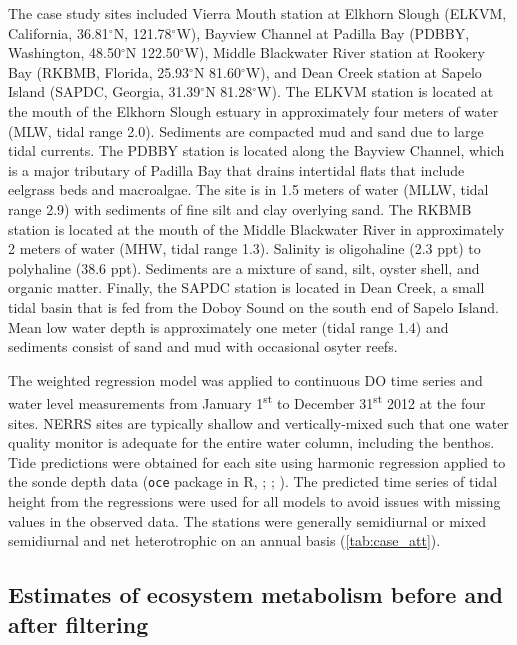 \documentclass[letterpaper,12pt,oneside]{article}\usepackage[]{graphicx}\usepackage[]{color}
\begin{document}
The case study sites included Vierra Mouth station at Elkhorn Slough (ELKVM, California, 36.81$^{\circ}$N, 121.78$^{\circ}$W), Bayview Channel at Padilla Bay (PDBBY, Washington, 48.50$^{\circ}$N 122.50$^{\circ}$W), Middle Blackwater River station at Rookery Bay (RKBMB, Florida, 25.93$^{\circ}$N 81.60$^{\circ}$W), and Dean Creek station at Sapelo Island (SAPDC, Georgia, 31.39$^{\circ}$N 81.28$^{\circ}$W).  The ELKVM station is located at the mouth of the Elkhorn Slough estuary in approximately four meters of water (MLW, tidal range 2.0).  Sediments are compacted mud and sand due to large tidal currents.  The PDBBY station is located along the Bayview Channel, which is a major tributary of Padilla Bay that drains intertidal flats that include eelgrass beds and macroalgae.  The site is in 1.5 meters of water (MLLW, tidal range 2.9) with sediments of fine silt and clay overlying sand.  The RKBMB station is located at the mouth of the Middle Blackwater River in approximately 2 meters of water (MHW, tidal range 1.3).  Salinity is oligohaline (2.3 ppt) to polyhaline (38.6 ppt).  Sediments are a mixture of sand, silt, oyster shell, and organic matter.  Finally, the SAPDC station is located in Dean Creek, a small tidal basin that is fed from the Doboy Sound on the south end of Sapelo Island.  Mean low water depth is approximately one meter (tidal range 1.4) and sediments consist of sand and mud with occasional osyter reefs. 

The weighted regression model was applied to continuous \ac{DO} time series and water level measurements from January 1\textsuperscript{st} to December 31\textsuperscript{st} 2012 at the four sites.  \ac{NERRS} sites are typically shallow and vertically-mixed such that one water quality monitor is adequate for the entire water column, including the benthos.  Tide predictions were obtained for each site using harmonic regression applied to the sonde depth data (\texttt{oce} package in R, \citealt{Foreman89}; \citealt{Kelley14}; ). The predicted time series of tidal height from the regressions were used for all models to avoid issues with missing values in the observed data. The stations were generally semidiurnal or mixed semidiurnal and net heterotrophic on an annual basis (\cref{tab:case_att}).

\subsection{Estimates of ecosystem metabolism before and after filtering} \label{met_sec}
\end{document}

